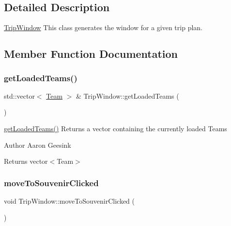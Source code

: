 \subsection{Detailed Description}
\mbox{\hyperlink{class_trip_window}{Trip\+Window}} This class generates the window for a given trip plan. 

\subsection{Member Function Documentation}
\mbox{\label{class_trip_window_a3e7069c4f2e25f84f8e1cc25eedabaa0}} 
\subsubsection{\texorpdfstring{getLoadedTeams()}{getLoadedTeams()}}
{\footnotesize\ttfamily std\+::vector$<$ \mbox{\hyperlink{class_team}{Team}} $>$ \& Trip\+Window\+::get\+Loaded\+Teams (\begin{DoxyParamCaption}{ }\end{DoxyParamCaption})}



\mbox{\hyperlink{class_trip_window_a3e7069c4f2e25f84f8e1cc25eedabaa0}{get\+Loaded\+Teams()}} Returns a vector containing the currently loaded Teams 

\begin{DoxyAuthor}{Author}
Aaron Geesink 
\end{DoxyAuthor}
\begin{DoxyReturn}{Returns}
vector$<$\+Team$>$ 
\end{DoxyReturn}
\mbox{\label{class_trip_window_a258950562707b2b3f37b86542a7e70cb}} 
\subsubsection{\texorpdfstring{moveToSouvenirClicked}{moveToSouvenirClicked}}
{\footnotesize\ttfamily void Trip\+Window\+::move\+To\+Souvenir\+Clicked (\begin{DoxyParamCaption}{ }\end{DoxyParamCaption})\hspace{0.3cm}{\ttfamily [signal]}}




